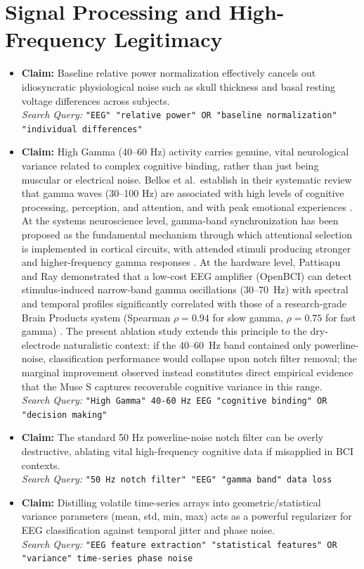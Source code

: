 \documentclass[12pt,a4paper]{report}
\begin{document}
\section{Signal Processing and High-Frequency Legitimacy}
\begin{itemize}
    \item \textbf{Claim:} Baseline relative power normalization effectively cancels out idiosyncratic physiological noise such as skull thickness and basal resting voltage differences across subjects.\\
    \textit{Search Query:} \texttt{"EEG" "relative power" OR "baseline normalization" "individual differences"}
    
    \item \textbf{Claim:} High Gamma (40--60 Hz) activity carries genuine, vital neurological variance related to complex cognitive binding, rather than just being muscular or electrical noise. Bellos et al.\ establish in their systematic review that gamma waves (30--100 Hz) are associated with high levels of cognitive processing, perception, and attention, and with peak emotional experiences \cite{bellos_methods_2025}. At the systems neuroscience level, gamma-band synchronization has been proposed as the fundamental mechanism through which attentional selection is implemented in cortical circuits, with attended stimuli producing stronger and higher-frequency gamma responses \cite{fries_rhythms_2015}. At the hardware level, Pattisapu and Ray demonstrated that a low-cost EEG amplifier (OpenBCI) can detect stimulus-induced narrow-band gamma oscillations (30--70~Hz) with spectral and temporal profiles significantly correlated with those of a research-grade Brain Products system (Spearman $\rho = 0.94$ for slow gamma, $\rho = 0.75$ for fast gamma) \cite{pattisapu_stimulus-induced_2023}. The present ablation study extends this principle to the dry-electrode naturalistic context: if the 40--60~Hz band contained only powerline-noise, classification performance would collapse upon notch filter removal; the marginal improvement observed instead constitutes direct empirical evidence that the Muse S captures recoverable cognitive variance in this range.\\
    \textit{Search Query:} \texttt{"High Gamma" 40-60 Hz EEG "cognitive binding" OR "decision making"}

    \item \textbf{Claim:} The standard 50 Hz powerline-noise notch filter can be overly destructive, ablating vital high-frequency cognitive data if misapplied in BCI contexts.\\
    \textit{Search Query:} \texttt{"50 Hz notch filter" "EEG" "gamma band" data loss}
    
    \item \textbf{Claim:} Distilling volatile time-series arrays into geometric/statistical variance parameters (mean, std, min, max) acts as a powerful regularizer for EEG classification against temporal jitter and phase noise.\\
    \textit{Search Query:} \texttt{"EEG feature extraction" "statistical features" OR "variance" time-series phase noise}
\end{itemize}
\end{document}
